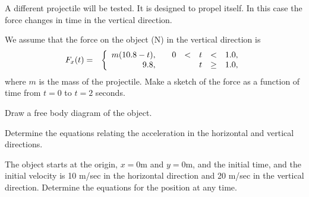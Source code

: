\begin{problem}
\item A different projectile will be tested. It is designed to propel
  itself. In this case the force changes in time in the vertical
  direction.
  \begin{subproblem}
  \item We assume that the force on the object (N) in the vertical
    direction is
      \begin{eqnarray*}
        F_x(t) & = & \left\{
                     \begin{array}{r@{\hspace{2em}}rcccl}
                       m(10.8-t), & 0 & < & t & < & 1.0, \\
                       9.8,       &   &   & t & \geq & 1.0,
                     \end{array}
                     \right.
      \end{eqnarray*}
      where $m$ is the mass of the projectile.
      Make a sketch of the force as a function of time from $t=0$ to
      $t=2$ seconds. 
      \vfill

    \item Draw a free body diagram of the object.
      \vfill

    \item Determine the equations relating the acceleration in the
      horizontal and vertical directions.

      \vfill

      \clearpage

    \item The object starts at the origin, $x=0$m and $y=0$m, and the
      initial time, and the initial velocity is 10 m/sec in the
      horizontal direction and 20 m/sec in the vertical
      direction. Determine the equations for the position at any time.

      \vfill

  \end{subproblem}

\end{problem}

